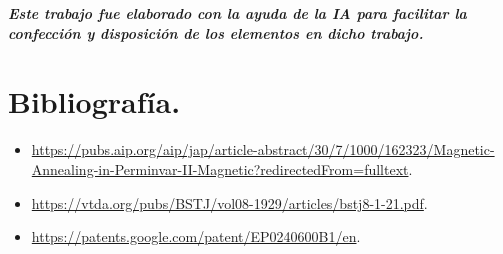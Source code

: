 \documentclass[12pt,a4paper]{article}
\begin{document}
\vfill
\textit{\textbf{Este trabajo fue elaborado con la ayuda de la IA para facilitar la confección y disposición de los elementos en dicho trabajo.}}
\newpage

\section{Bibliografía.}

\begin{itemize}
    \item \url{https://pubs.aip.org/aip/jap/article-abstract/30/7/1000/162323/Magnetic-Annealing-in-Perminvar-II-Magnetic?redirectedFrom=fulltext}.
    \item \url{https://vtda.org/pubs/BSTJ/vol08-1929/articles/bstj8-1-21.pdf}.
    \item \url{https://patents.google.com/patent/EP0240600B1/en}.
\end{itemize}
\end{document}
